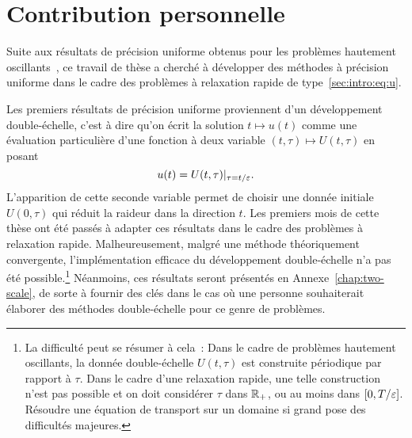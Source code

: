 \section*{Contribution personnelle}


Suite aux résultats de précision uniforme obtenus pour les problèmes hautement oscillants~\cite{chartier.2015.uniformly,crouseilles.2017.nonlinear,chartier.2020.new}, ce travail de thèse a cherché à développer des méthodes à précision uniforme dans le cadre des problèmes à relaxation rapide de type~\eqref{sec:intro:eq:u}. 

Les premiers résultats de précision uniforme proviennent d'un développement double-échelle, c'est à dire qu'on écrit la solution $t \mapsto u(t)$ comme une évaluation particulière d'une fonction à deux variable $(t,\tau) \mapsto U(t,\tau)$ en posant
\begin{equation*}
    u(t) = U(t,\tau)|_{\tau = t/\varepsilon} .
\end{equation*}
L'apparition de cette seconde variable permet de choisir une donnée initiale $U(0,\tau)$ qui réduit la raideur dans la direction $t$. Les premiers mois de cette thèse ont été passés à adapter ces résultats dans le cadre des problèmes à relaxation rapide. Malheureusement, malgré une méthode théoriquement convergente, l'implémentation efficace du développement double-échelle n'a pas été possible.\footnote{La difficulté peut se résumer à cela~: Dans le cadre de problèmes hautement oscillants, la donnée double-échelle $U(t,\tau)$ est construite périodique par rapport à $\tau$. Dans le cadre d'une relaxation rapide, une telle construction n'est pas possible et on doit considérer $\tau$ dans $\mathbb{R}_+$, ou au moins dans $[0,T/\varepsilon]$. Résoudre une équation de transport sur un domaine si grand pose des difficultés majeures.} Néanmoins, ces résultats seront présentés en Annexe~\ref{chap:two-scale}, de sorte à fournir des clés dans le cas où une personne souhaiterait élaborer des méthodes double-échelle pour ce genre de problèmes.


